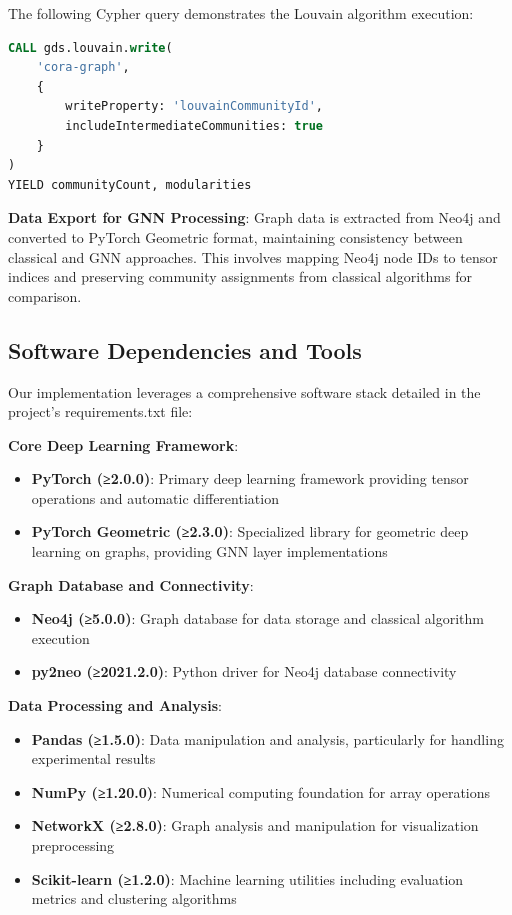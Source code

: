 \documentclass[conference]{IEEEtran}
\begin{document}
The following Cypher query demonstrates the Louvain algorithm execution:

\begin{lstlisting}[language=SQL, caption=Louvain Algorithm Execution in Neo4j]
CALL gds.louvain.write(
    'cora-graph',
    {
        writeProperty: 'louvainCommunityId',
        includeIntermediateCommunities: true
    }
)
YIELD communityCount, modularities
\end{lstlisting}

\textbf{Data Export for GNN Processing}: Graph data is extracted from Neo4j and converted to PyTorch Geometric format, maintaining consistency between classical and GNN approaches. This involves mapping Neo4j node IDs to tensor indices and preserving community assignments from classical algorithms for comparison.

\subsection{Software Dependencies and Tools}

Our implementation leverages a comprehensive software stack detailed in the project's requirements.txt file:

\textbf{Core Deep Learning Framework}:
\begin{itemize}
    \item \textbf{PyTorch (≥2.0.0)}: Primary deep learning framework providing tensor operations and automatic differentiation
    \item \textbf{PyTorch Geometric (≥2.3.0)}: Specialized library for geometric deep learning on graphs, providing GNN layer implementations
\end{itemize}

\textbf{Graph Database and Connectivity}:
\begin{itemize}
    \item \textbf{Neo4j (≥5.0.0)}: Graph database for data storage and classical algorithm execution
    \item \textbf{py2neo (≥2021.2.0)}: Python driver for Neo4j database connectivity
\end{itemize}

\textbf{Data Processing and Analysis}:
\begin{itemize}
    \item \textbf{Pandas (≥1.5.0)}: Data manipulation and analysis, particularly for handling experimental results
    \item \textbf{NumPy (≥1.20.0)}: Numerical computing foundation for array operations
    \item \textbf{NetworkX (≥2.8.0)}: Graph analysis and manipulation for visualization preprocessing
    \item \textbf{Scikit-learn (≥1.2.0)}: Machine learning utilities including evaluation metrics and clustering algorithms
\end{itemize}
\end{document}
